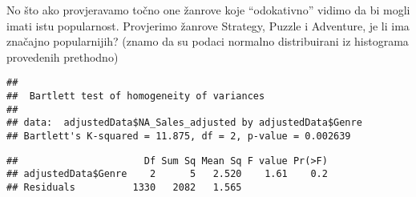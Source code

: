 \documentclass[
]{article}
\newenvironment{Shaded}{\begin{snugshade}}{\end{snugshade}}
\newcommand{\CommentTok}[1]{\textcolor[rgb]{0.56,0.35,0.01}{\textit{#1}}}
\newcommand{\DecValTok}[1]{\textcolor[rgb]{0.00,0.00,0.81}{#1}}
\newcommand{\FunctionTok}[1]{\textcolor[rgb]{0.00,0.00,0.00}{#1}}
\newcommand{\NormalTok}[1]{#1}
\newcommand{\OtherTok}[1]{\textcolor[rgb]{0.56,0.35,0.01}{#1}}
\newcommand{\SpecialCharTok}[1]{\textcolor[rgb]{0.00,0.00,0.00}{#1}}
\newcommand{\StringTok}[1]{\textcolor[rgb]{0.31,0.60,0.02}{#1}}
\begin{document}
No što ako provjeravamo točno one žanrove koje ``odokativno'' vidimo da
bi mogli imati istu popularnost. Provjerimo žanrove Strategy, Puzzle i
Adventure, je li ima značajno popularnijih? (znamo da su podaci normalno
distribuirani iz histograma provedenih prethodno)

\begin{Shaded}
\end{Shaded}

\begin{verbatim}
## 
##  Bartlett test of homogeneity of variances
## 
## data:  adjustedData$NA_Sales_adjusted by adjustedData$Genre
## Bartlett's K-squared = 11.875, df = 2, p-value = 0.002639
\end{verbatim}

\begin{Shaded}
\end{Shaded}

\begin{verbatim}
##                      Df Sum Sq Mean Sq F value Pr(>F)
## adjustedData$Genre    2      5   2.520    1.61    0.2
## Residuals          1330   2082   1.565
\end{verbatim}
\end{document}
